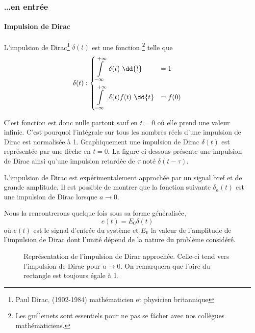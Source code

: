 \subsubsection{\ldots en entrée}

\paragraph{Impulsion de Dirac}

L'impulsion de Dirac\footnote{Paul Dirac, (1902-1984) mathématicien et 
physicien britannique} $\delta(t)$ est une \og fonction\fg 
\footnote{Les guillemets sont essentiels pour ne pas se fâcher avec nos collègues mathématiciens.} telle que
\begin{align*}
\delta(t) : 
\begin{dcases}
	\int\limits_{-\infty}^{+\infty}	 \delta(t)\,\,\dd{t}&=1   \\
\int\limits_{-\infty}^{+\infty}  \delta(t)f(t)\,\,\dd{t}&=f(0)	
\end{dcases}
\end{align*}

C'est fonction est donc nulle partout sauf en $t=0$ où elle prend 
une valeur infinie. C'est pourquoi l'intégrale sur tous les nombres réels d'une impulsion 
de Dirac est normalisée à 1.
Graphiquement une impulsion de Dirac $\delta(t)$ est 
représentée par une flèche en $t=0$. La figure ci-dessous présente 
une impulsion de Dirac ainsi qu'une 
impulsion retardée de $\tau$ noté $\delta(t-\tau)$.

\begin{figure}[!h]
\begin{center}

\end{center}
\end{figure}

L'impulsion de Dirac est expérimentalement approchée par un signal 
bref et de grande amplitude. Il est possible de montrer que la fonction
suivante $\delta_a(t)$ est une impulsion de Dirac lorsque $a\to0$.

Nous la rencontrerons quelque fois sous sa forme généralisée, 
$$
e(t)=E_0\delta(t)
$$
où $e(t)$ est le signal d'entrée du système et $E_0$ la valeur de l'amplitude de l'impulsion de Dirac
dont l'unité dépend de la nature du problème considéré.
\begin{figure}[!h]
\begin{center}

    \caption{Représentation de l'impulsion de Dirac approchée. 
    Celle-ci tend vers l'impulsion de Dirac pour $a\to0$. On remarquera que l'aire du rectangle est toujours égale à 1.\label{fig-dirac2}}
\end{center}
\end{figure}

